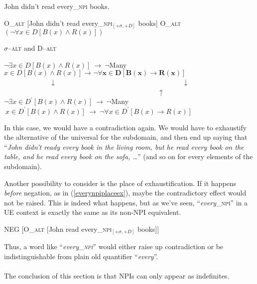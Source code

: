 \documentclass[a4paper,11pt]{article}
\newcommand{\reff}[1]{(\ref{#1})}
\newcommand{\exs}[2][]{\begin{exe}\ex #1 \begin{xlist}#2\end{xlist}\end{exe}}
\begin{document}
\exs[\label{readeverynpineg}]{
  \ex John didn't read every_{\textsc{npi}} books.
  \ex
    \begin{xlist}
      \ex\label{readeverynpioneg} O_{\textsc{alt}} [John didn't read every_{\textsc{npi}}$_{[+\sigma,+D]}$ books]
      \ex O_{\textsc{alt}} $(\neg \forall{x \in D}[B(x) \wedge R(x)])$
    \end{xlist}
  \ex\label{readeverynpialtneg} $\sigma$--\textsc{alt} and D--\textsc{alt}
    \begin{xlist}
      \ex $\neg \exists{x \in D}[B(x) \wedge R(x)]~\longrightarrow~\neg $Many${x\in D}[B(x) \wedge R(x)]\longrightarrow \boldsymbol{\neg \forall{x \in D}[B(x) \rightarrow R(x)]}$\\
      \indent~~~~~~~~~~~~~$\downarrow$~~~~~~~~~~~~~~~~~~~~~~~~~~~~~~~~~~~~$\downarrow$~~~~~~~~~~~~~~~~~~~~~~~~~~~~~~~~~~~~~~~~~~~~$\uparrow$
      \ex $\neg \exists{x \in D^{\prime}}[B(x) \wedge R(x)]~\longrightarrow~\neg $Many$~{x \in D^{\prime}}[B(x) \wedge R(x)]~\longrightarrow~\neg \forall{x \in D^{\prime}}[B(x) \rightarrow R(x)]$
    \end{xlist}
}
%
In this case, we would have a contradiction again. We would have to exhaustify the alternative of the universal for the subdomain, and then end up saying that \enquote{\emph{John didn't ready every book in the living room, but he read every book on the table, and he read every book on the sofa, \ldots{}}} (and so on for every elements of the subdomain).

Another possibility to consider is the place of exhaustification. If it happens \emph{before} negation, as in \reff{everynpiplaceex}, maybe the contradictory effect would not be raised. This is indeed what happens, but as we've seen, \enquote{\emph{every}_{\textsc{npi}}} in a UE context is exactly the same as its non-NPI equivalent.

\begin{exe}
	\ex\label{everynpiplaceex} NEG [O_{\textsc{alt}} [John read every_{\textsc{npi}}$_{[+\sigma,+D]}$ books]]
\end{exe}

Thus, a word like \enquote{\emph{every_{\textsc{npi}}}} would either raise up contradiction or be indistinguishable from plain old quantifier \enquote{\emph{every}}.

\paragraph{}
The conclusion of this section is that NPIs can only appear as indefinites.
\end{document}
